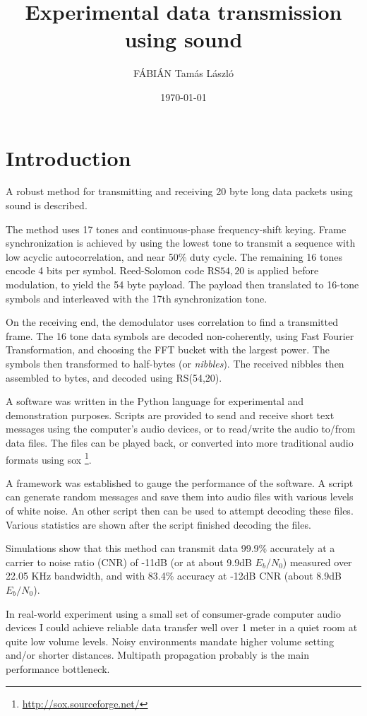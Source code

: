 \documentclass[a4paper]{article}
\title{Experimental data transmission using sound}
\author{FÁBIÁN Tamás László}
\date{\today}
\begin{document}
\maketitle

\section{Introduction}

A robust method for transmitting and receiving 20 byte long data 
packets using sound is described.

The method uses 17 tones and continuous-phase frequency-shift keying. 
Frame synchronization is achieved by using the lowest tone to transmit 
a sequence with low acyclic autocorrelation, and near 50\% duty cycle. 
The remaining 16 tones encode 4 bits per symbol. Reed-Solomon code 
RS\(54,20\) is applied before modulation, to yield the 54 byte payload. 
The payload then translated to 16-tone symbols and interleaved with the 
17th synchronization tone.

On the receiving end, the demodulator uses correlation to find a 
transmitted frame. The 16 tone data symbols are decoded non-coherently, 
using Fast Fourier Transformation, and choosing the FFT bucket with the 
largest power. The symbols then transformed to half-bytes (or 
\textit{nibbles}). The received nibbles then assembled to bytes, and 
decoded using RS(54,20).

A software was written in the Python language for experimental and 
demonstration purposes. Scripts are provided to send and receive short 
text messages using the computer's audio devices, or to read/write the 
audio to/from data files. The files can be played back, or converted 
into more traditional audio formats using sox
\footnote{\url{http://sox.sourceforge.net/}}.

A framework was established to gauge the performance of the software. A 
script can generate random messages and save them into audio files with 
various levels of white noise. An other script then can be used to 
attempt decoding these files. Various statistics are shown after the 
script finished decoding the files.

Simulations show that this method can transmit data 99.9\% accurately 
at a carrier to noise ratio (CNR) of -11dB (or at about 9.9dB 
$E_b/N_0$) measured over 22.05 KHz bandwidth, and with 83.4\% accuracy 
at -12dB CNR (about 8.9dB $E_b/N_0$).

In real-world experiment using a small set of consumer-grade computer 
audio devices I could achieve reliable data transfer well over 1 meter 
in a quiet room at quite low volume levels. Noisy environments mandate 
higher volume setting and/or shorter distances. Multipath propagation
probably is the main performance bottleneck.
\end{document}

